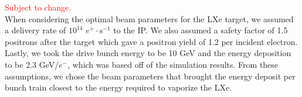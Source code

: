 \documentclass[
reprint,
nofootinbib,
amsmath, amssymb,
aps,
floatfix,
]{revtex4-2}
\begin{document}
\textcolor{red}{Subject to change.}\\
When considering the optimal beam parameters for the LXe target, we assumed a delivery rate of $10^{14}$ ${e^+\cdot \textrm{s}^{-1}}$
to the IP.  We also assumed a safety factor of 1.5 positrons after the target which gave a positron yield of 1.2 per incident electron.
Lastly, we took the drive bunch energy to be 10 GeV and the energy deposition to be 2.3 GeV/$e^-$, which was based off of the simulation results.
From these assumptions, we chose the beam parameters that brought the energy deposit per bunch train closest to the energy required to 
vaporize the LXe.


\end{document}
